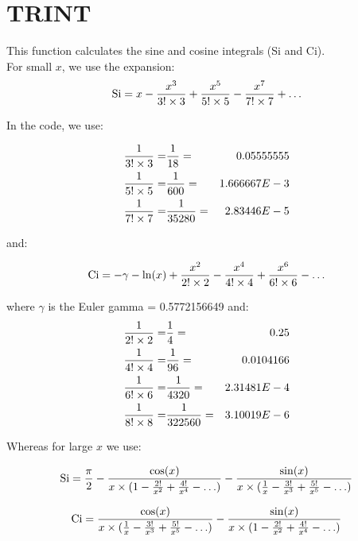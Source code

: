 \section{TRINT}
\label{sect:trint}

\noindent This function calculates the sine and cosine integrals (Si and
Ci).\\

\noindent For small $x$, we use the expansion:\\

\begin{equation}
\mathrm{Si} = x - {x^3 \over 3! \times 3} + {x^5 \over 5! \times 5} -
{x^7 \over 7! \times 7} + {\ldots}
\end{equation}

\noindent In the code, we use:

\begin{eqnarray*}
{1 \over 3! \times 3} =& {1 \over 18}    =& 0.05555555\\
{1 \over 5! \times 5} =& {1 \over 600}   =& 1.666667E-3\\
{1 \over 7! \times 7} =& {1 \over 35280} =& 2.83446E-5
\end{eqnarray*}

\noindent and:

\begin{equation}
\mathrm{Ci} = -\gamma - \ln(x) + {x^2 \over 2! \times 2} -
{x^4 \over 4! \times 4} + {x^6 \over 6! \times 6} - \ldots
\end{equation}

\noindent where $\gamma$ is the Euler gamma = 0.5772156649 and:\\

\begin{eqnarray*}
{1 \over 2! \times 2} =& {1 \over 4}      =& 0.25\\
{1 \over 4! \times 4} =& {1 \over 96}     =& 0.0104166\\
{1 \over 6! \times 6} =& {1 \over 4320}   =& 2.31481E-4\\
{1 \over 8! \times 8} =& {1 \over 322560} =& 3.10019E-6
\end{eqnarray*}

\noindent Whereas for large $x$ we use:

\begin{equation}
\mathrm{Si} = {\pi \over 2} - 
{\cos(x) \over {x \times (1 - {2! \over x^2} + {4! \over x^4} - \ldots)}}
- {\sin(x) \over {x \times ({1 \over x} - {3! \over x^3} + {5! \over x^5} -
\ldots)}}
\end{equation}

\begin{equation}
\mathrm{Ci} = {\cos(x) \over x \times ({1 \over x} - {3! \over x^3} + {5! \over x^5} - \ldots)}
- {\sin(x) \over x \times (1 - {2! \over x^2} + {4! \over x^4} - \ldots)}
\end{equation}
